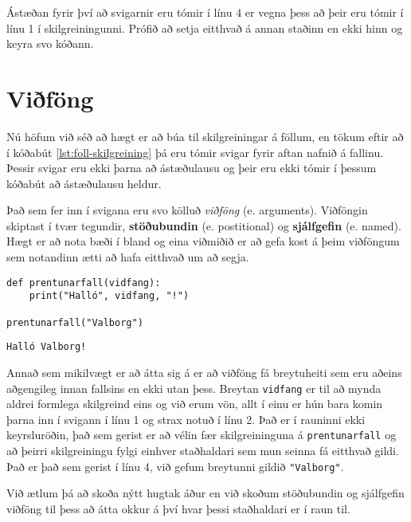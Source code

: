 Ástæðan fyrir því að svigarnir eru tómir í línu 4 er vegna þess að þeir eru tómir í línu 1 í skilgreiningunni.
Prófið að setja eitthvað á annan staðinn en ekki hinn og keyra svo kóðann.

\section{Viðföng}
Nú höfum við séð að hægt er að búa til skilgreiningar á föllum, en tökum eftir að í kóðabút \ref{lst:foll-skilgreining} þá eru tómir svigar fyrir aftan nafnið á fallinu.
Þessir svigar eru ekki þarna að ástæðulausu og þeir eru ekki tómir í þessum kóðabút að ástæðulausu heldur.

Það sem fer inn í svigana eru svo kölluð \emph{viðföng} (e. arguments).
Viðföngin skiptast í tvær tegundir, \textbf{stöðubundin} (e. postitional) og \textbf{sjálfgefin} (e. named).
Hægt er að nota bæði í bland og eina viðmiðið er að gefa kost á þeim viðföngum sem notandinn ætti að hafa eitthvað um að segja.

\begin{lstlisting}[caption=Föll með viðföngum, label=lst:foll-vidfong]
def prentunarfall(vidfang):
	print("Halló", vidfang, "!")
	
prentunarfall("Valborg")
\end{lstlisting}
\lstset{style=uttak}
\begin{lstlisting}
Halló Valborg!
\end{lstlisting}
\lstset{style=venjulegt}

Annað sem mikilvægt er að átta sig á er að viðföng fá breytuheiti sem eru aðeins aðgengileg innan fallsins en ekki utan þess.
Breytan \texttt{vidfang} er til að mynda aldrei formlega skilgreind eins og við erum vön, allt í einu er hún bara komin þarna inn í svigann í línu 1 og strax notuð í línu 2.
Það er í rauninni ekki keyrsluröðin, það sem gerist er að vélin fær skilgreininguna á \texttt{prentunarfall} og að þeirri skilgreiningu fylgi einhver staðhaldari sem mun seinna fá eitthvað gildi.
Það er það sem gerist í línu 4, við gefum breytunni gildið \texttt{"Valborg"}.

Við ætlum þá að skoða nýtt hugtak áður en við skoðum stöðubundin og sjálfgefin viðföng til þess að átta okkur á því hvar þessi staðhaldari er í raun til.

